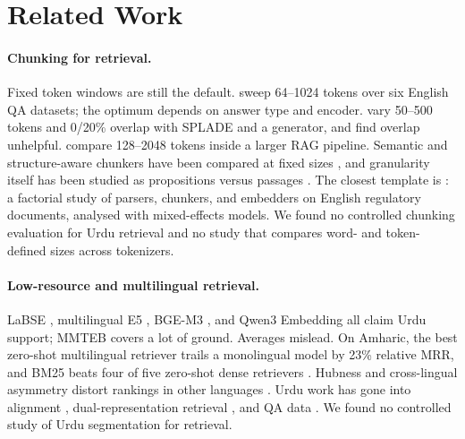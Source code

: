 \documentclass[11pt]{article}
\begin{document}
\section{Related Work}

\paragraph{Chunking for retrieval.}
Fixed token windows are still the default. \citet{bhat2025rethinking} sweep 64--1024 tokens over six
English QA datasets; the optimum depends on answer type and encoder. \citet{bennani2026a} vary
50--500 tokens and 0/20\% overlap with SPLADE and a generator, and find overlap unhelpful.
\citet{wang2024searching} compare 128--2048 tokens inside a larger RAG pipeline. Semantic and
structure-aware chunkers have been compared at fixed sizes
\citep{qu2024is,zhou2026beyond,caspari2026when,merola2025reconstructing,gnther2024late}, and
granularity itself has been studied as propositions versus passages \citep{chen2023dense}. The
closest template is \citet{singh2026parser}: a factorial study of parsers, chunkers, and embedders
on English regulatory documents, analysed with mixed-effects models. We found no controlled
chunking evaluation for Urdu retrieval and no study that compares word- and token-defined sizes
across tokenizers.

\paragraph{Low-resource and multilingual retrieval.}
LaBSE \citep{feng2020languageagnostic}, multilingual E5 \citep{wang2024multilingual}, BGE-M3
\citep{chen2024m3embedding}, and Qwen3 Embedding \citep{zhang2025qwen3} all claim Urdu support;
MMTEB \citep{enevoldsen2025mmteb} covers a lot of ground. Averages mislead. On Amharic, the best
zero-shot multilingual retriever trails a monolingual model by 23\% relative MRR, and BM25 beats
four of five zero-shot dense retrievers \citep{alemneh2026the}. Hubness and cross-lingual asymmetry
distort rankings in other languages \citep{sakhawat2026hubness,goworek2025what}. Urdu work has gone
into alignment \citep{faheem-etal-2026-beyond}, dual-representation retrieval
\citep{ahmad-etal-2026-drrag}, and QA data \citep{arif2024uqa,butt2024enabling}. We found no
controlled study of Urdu segmentation for retrieval.
\end{document}
